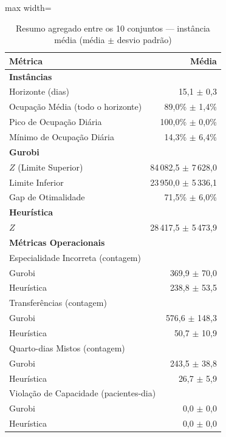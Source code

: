 \begin{table}[htbp]
    \caption{Resumo agregado entre os 10 conjuntos --- instância média (média $\pm$ desvio padrão)}
    \label{tab:agregado-medio}
    \centering
    \begin{adjustbox}{max width=\textwidth}
    \begin{tabular}{lr}
        \hline
        \textbf{Métrica} & \textbf{Média} \\
        \hline
        \multicolumn{2}{l}{\textbf{Instâncias}} \\
        Horizonte (dias) & 15,1 $\pm$ 0,3 \\
        Ocupação Média (todo o horizonte) & 89,0\% $\pm$ 1,4\% \\
        Pico de Ocupação Diária & 100,0\% $\pm$ 0,0\% \\
        Mínimo de Ocupação Diária & 14,3\% $\pm$ 6,4\% \\
        \hline
        \multicolumn{2}{l}{\textbf{Gurobi}} \\
        $Z$ (Limite Superior) & 84\,082,5 $\pm$ 7\,628,0 \\
        Limite Inferior & 23\,950,0 $\pm$ 5\,336,1 \\
        Gap de Otimalidade & 71,5\% $\pm$ 6,0\% \\
        \hline
        \multicolumn{2}{l}{\textbf{Heurística}} \\
        $Z$ & 28\,417,5 $\pm$ 5\,473,9 \\
        \hline
        \multicolumn{2}{l}{\textbf{Métricas Operacionais}} \\
        \multicolumn{2}{l}{Especialidade Incorreta (contagem)} \\
        \quad Gurobi & 369,9 $\pm$ 70,0 \\
        \quad Heurística & 238,8 $\pm$ 53,5 \\
        \multicolumn{2}{l}{Transferências (contagem)} \\
        \quad Gurobi & 576,6 $\pm$ 148,3 \\
        \quad Heurística & 50,7 $\pm$ 10,9 \\
        \multicolumn{2}{l}{Quarto-dias Mistos (contagem)} \\
        \quad Gurobi & 243,5 $\pm$ 38,8 \\
        \quad Heurística & 26,7 $\pm$ 5,9 \\
        \multicolumn{2}{l}{Violação de Capacidade (pacientes-dia)} \\
        \quad Gurobi & 0,0 $\pm$ 0,0 \\
        \quad Heurística & 0,0 $\pm$ 0,0 \\
        \hline
    \end{tabular}
    \end{adjustbox}
\end{table}
